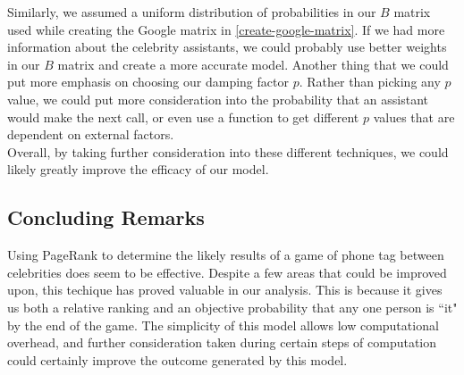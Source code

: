 \documentclass[11pt]{article}
\begin{document}
      Similarly, we assumed a uniform distribution of probabilities in our $B$ matrix used while creating the Google matrix in \ref{create-google-matrix}.
      If we had more information about the celebrity assistants, we could probably use better weights in our $B$ matrix and create a more accurate model.
      Another thing that we could put more emphasis on choosing our damping factor $p$.
      Rather than picking any $p$ value, we could put more consideration into the probability that an assistant would make the next call, or even use a function to get different $p$ values that are dependent on external factors.
      \\
      
      Overall, by taking further consideration into these different techniques, we could likely greatly improve the efficacy of our model.

      \subsection{Concluding Remarks}
      Using PageRank to determine the likely results of a game of phone tag between celebrities does seem to be effective.
      Despite a few areas that could be improved upon, this techique has proved valuable in our analysis.
      This is because it gives us both a relative ranking and an objective probability that any one person is ``it" by the end of the game.
      The simplicity of this model allows low computational overhead, and further consideration taken during certain steps of computation could certainly improve the outcome generated by this model.
\end{document}
